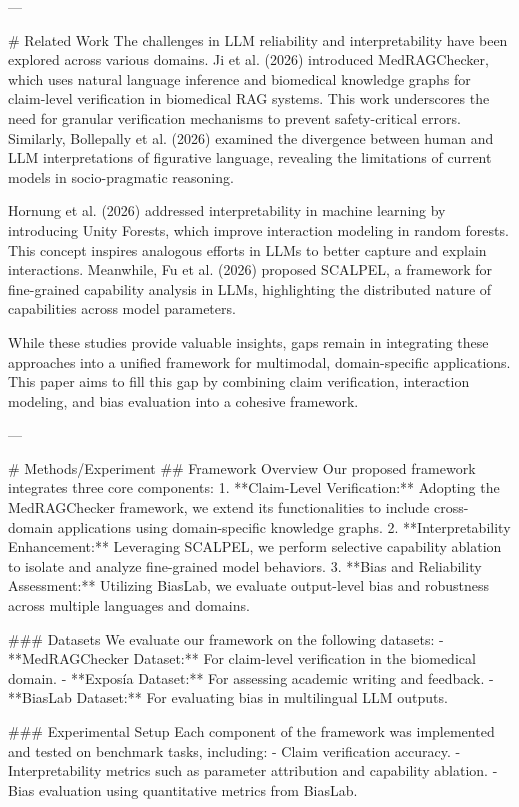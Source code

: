 ---

# Related Work  
The challenges in LLM reliability and interpretability have been explored across various domains. Ji et al. (2026) introduced MedRAGChecker, which uses natural language inference and biomedical knowledge graphs for claim-level verification in biomedical RAG systems. This work underscores the need for granular verification mechanisms to prevent safety-critical errors. Similarly, Bollepally et al. (2026) examined the divergence between human and LLM interpretations of figurative language, revealing the limitations of current models in socio-pragmatic reasoning.

Hornung et al. (2026) addressed interpretability in machine learning by introducing Unity Forests, which improve interaction modeling in random forests. This concept inspires analogous efforts in LLMs to better capture and explain interactions. Meanwhile, Fu et al. (2026) proposed SCALPEL, a framework for fine-grained capability analysis in LLMs, highlighting the distributed nature of capabilities across model parameters.

While these studies provide valuable insights, gaps remain in integrating these approaches into a unified framework for multimodal, domain-specific applications. This paper aims to fill this gap by combining claim verification, interaction modeling, and bias evaluation into a cohesive framework.

---

# Methods/Experiment  
## Framework Overview  
Our proposed framework integrates three core components:  
1. **Claim-Level Verification:** Adopting the MedRAGChecker framework, we extend its functionalities to include cross-domain applications using domain-specific knowledge graphs.  
2. **Interpretability Enhancement:** Leveraging SCALPEL, we perform selective capability ablation to isolate and analyze fine-grained model behaviors.  
3. **Bias and Reliability Assessment:** Utilizing BiasLab, we evaluate output-level bias and robustness across multiple languages and domains.  

### Datasets  
We evaluate our framework on the following datasets:  
- **MedRAGChecker Dataset:** For claim-level verification in the biomedical domain.  
- **Exposía Dataset:** For assessing academic writing and feedback.  
- **BiasLab Dataset:** For evaluating bias in multilingual LLM outputs.  

### Experimental Setup  
Each component of the framework was implemented and tested on benchmark tasks, including:  
- Claim verification accuracy.  
- Interpretability metrics such as parameter attribution and capability ablation.  
- Bias evaluation using quantitative metrics from BiasLab.  

